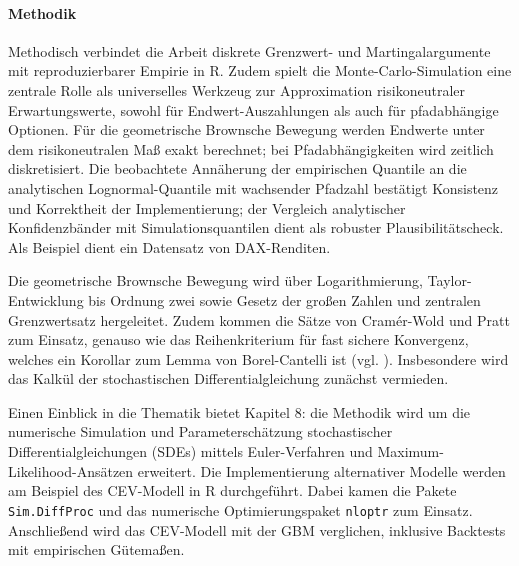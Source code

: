 \paragraph{Methodik}
Methodisch verbindet die Arbeit diskrete Grenzwert- und Martingalargumente mit 
reproduzierbarer Empirie in R. Zudem spielt die Monte-Carlo-Simulation eine zentrale Rolle als universelles 
Werkzeug zur Approximation risikoneutraler Erwartungswerte,
sowohl für Endwert-Auszahlungen als auch für pfadabhängige Optionen. Für die geometrische Brownsche 
Bewegung werden Endwerte unter dem risikoneutralen Maß exakt berechnet; bei Pfadabhängigkeiten wird zeitlich diskretisiert.
Die beobachtete Annäherung der empirischen Quantile an die analytischen Lognormal-Quantile mit wachsender Pfadzahl bestätigt 
Konsistenz und Korrektheit der Implementierung; der Vergleich analytischer Konfidenzbänder mit Simulationsquantilen dient als robuster Plausibilitätscheck.
Als Beispiel dient ein Datensatz von DAX-Renditen.

Die geometrische Brownsche Bewegung wird über Logarithmierung, Taylor-Entwicklung bis Ordnung zwei sowie Gesetz der großen Zahlen und 
zentralen Grenzwertsatz hergeleitet. Zudem kommen die Sätze von Cramér-Wold und Pratt zum Einsatz, 
genauso wie das Reihenkriterium für fast sichere Konvergenz, welches 
ein Korollar zum Lemma von Borel-Cantelli ist (vgl. \cite{henze}). Insbesondere wird das Kalkül der stochastischen Differentialgleichung zunächst vermieden.

Einen Einblick in die Thematik bietet Kapitel 8: die Methodik wird um die numerische Simulation und Parameterschätzung stochastischer Differentialgleichungen (SDEs) mittels Euler-Verfahren und Maximum-Likelihood-Ansätzen erweitert. 
Die Implementierung alternativer Modelle werden am Beispiel des CEV-Modell in R durchgeführt.
Dabei kamen die Pakete \texttt{Sim.DiffProc} und das numerische Optimierungspaket \texttt{nloptr} zum Einsatz.
Anschließend wird das CEV-Modell mit der GBM verglichen, inklusive Backtests mit empirischen Gütemaßen.
